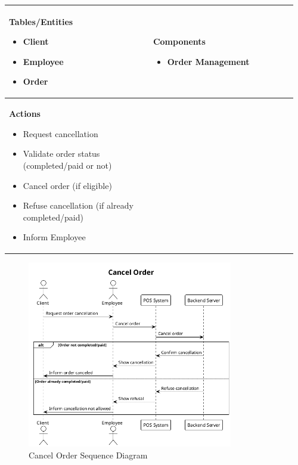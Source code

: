 \documentclass[]{VUMIFTemplateClass}
\newenvironment{mpitemlist}[1][\linewidth]{%
    \begin{minipage}[t]{#1}%
        \setlength{\leftmargini}{12pt}%
        \begin{itemize}%
            \setlength{\itemsep}{1pt}%
            \setlength{\parskip}{0pt}%
            \setlength{\parsep}{0pt}%
}{%
        \end{itemize}%
    \end{minipage}\newline
}
\begin{document}
\begin{center}
\setlength{\tabcolsep}{8pt}
\begin{tabular}{|p{0.48\linewidth}|p{0.48\linewidth}|}
\hline
\textbf{Tables/Entities} \newline
\begin{mpitemlist}
\item Client
\item Employee
\item Order
\end{mpitemlist}
&
\textbf{Components} \newline
\begin{mpitemlist}
\item Order Management
\end{mpitemlist}
\\ \hline
\textbf{Actions} \newline
\begin{mpitemlist}
\item Request cancellation
\item Validate order status (completed/paid or not)
\item Cancel order (if eligible)
\item Refuse cancellation (if already completed/paid)
\item Inform Employee
\end{mpitemlist}
&

\\ \hline
\end{tabular}
\end{center}

\begin{figure}[H]
    \centering
    \includegraphics[width=0.8\textwidth]{images/diagrams/orders/order_cancel_order_sequence.png}
    \caption{Cancel Order Sequence Diagram}
    \label{fig:cancel_order_sequence}
\end{figure}
\end{document}
